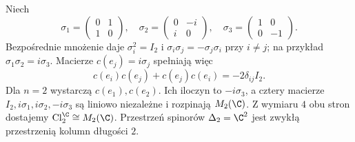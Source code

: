 \begin{przyklad}
\label{prz:pauli}
Niech
\[
 \sigma_1=\begin{pmatrix}0&1\\1&0\end{pmatrix},
 \quad
 \sigma_2=\begin{pmatrix}0&-i\\i&0\end{pmatrix},
 \quad
 \sigma_3=\begin{pmatrix}1&0\\0&-1\end{pmatrix}.
\]
Bezpośrednie mnożenie daje
$\sigma_i^2=I_2$ i
$\sigma_i\sigma_j=-\sigma_j\sigma_i$ przy $i\ne j$;
na przykład $\sigma_1\sigma_2=i\sigma_3$.
Macierze $c(e_j)=i\sigma_j$ spełniają więc
\[
 c(e_i)c(e_j)+c(e_j)c(e_i)=-2\delta_{ij}I_2.
\]
Dla $n=2$ wystarczą $c(e_1),c(e_2)$.
Ich iloczyn to $-i\sigma_3$, a cztery macierze
$I_2,i\sigma_1,i\sigma_2,-i\sigma_3$
są liniowo niezależne i rozpinają
$M_2(\C)$. Z wymiaru $4$ obu stron dostajemy
$\operatorname{Cl}^{\C}_2\cong M_2(\C)$.
Przestrzeń spinorów $\Delta_2=\C^2$
jest zwykłą przestrzenią kolumn długości $2$.
\end{przyklad}

